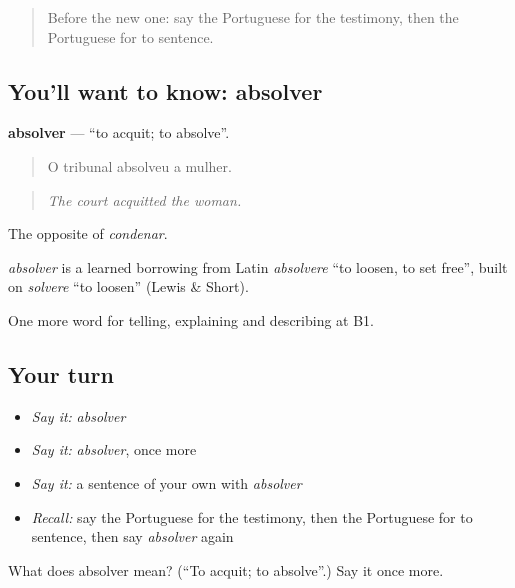\label{lesson:PT-C297-absolver}



\begin{quote}
Before the new one: say the Portuguese for the testimony, then the Portuguese for to sentence.
\end{quote}

\subsection*{You'll want to know: absolver}
\textbf{absolver} — \textquotedblleft{}to acquit; to absolve\textquotedblright{}.

\begin{quote}
O tribunal absolveu a mulher.
\end{quote}

\begin{quote}
\emph{The court acquitted the woman.}
\end{quote}

The opposite of \emph{condenar}.

\begin{cousinweb}
\emph{absolver} is a learned borrowing from Latin \emph{absolvere} \textquotedblleft{}to loosen, to set free\textquotedblright{}, built on \emph{solvere} \textquotedblleft{}to loosen\textquotedblright{} (Lewis \& Short).
\end{cousinweb}

\begin{grammarlens}[title={What you've built}]
One more word for telling, explaining and describing at B1.
\end{grammarlens}

\subsection*{Your turn}
\begin{itemize}
\raggedright
  \item \emph{Say it:} \emph{absolver}
  \item \emph{Say it:} \emph{absolver}, once more
  \item \emph{Say it:} a sentence of your own with \emph{absolver}
  \item \emph{Recall:} say the Portuguese for the testimony, then the Portuguese for to sentence, then say \emph{absolver} again
\end{itemize}

\begin{tcolorbox}[breakable,colback=teal!4,colframe=teal!35!black,title={Before you move on}]
What does absolver mean? (\textquotedblleft{}To acquit; to absolve\textquotedblright{}.) Say it once more.
\end{tcolorbox}
